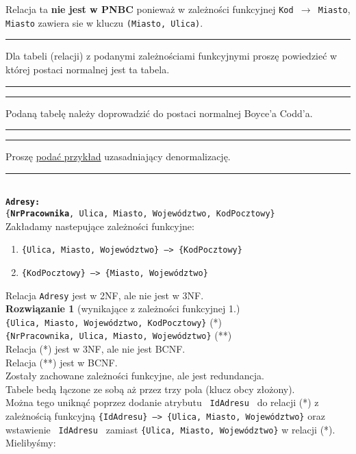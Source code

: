 \documentclass[a5paper,6pt]{article}
\newcommand{\horrule}[1]{\rule{\linewidth}{#1}}
\begin{document}
    Relacja ta \textbf{nie jest w PNBC} ponieważ w zależności funkcyjnej
    \texttt{Kod $\rightarrow$ Miasto}, \texttt{ Miasto} zawiera sie w kluczu
    \texttt{(Miasto, Ulica)}.\\


    \horrule{0.5pt}
    Dla tabeli (relacji) z podanymi zależnościami funkcyjnymi proszę powiedzieć
    w której postaci normalnej jest ta tabela.\\
    \horrule{0.5pt}

    \horrule{0.5pt}
    Podaną tabelę należy doprowadzić do postaci normalnej Boyce’a Codd’a.\\
    \horrule{0.5pt}

    \horrule{0.5pt}
    Proszę \underline{podać przykład} uzasadniający denormalizację.\\
    \horrule{0.5pt}\\

    \texttt{\textbf{Adresy:}\\
    \{\textbf{{\color{green}\faKey}NrPracownika}, Ulica, Miasto,
    Województwo, KodPocztowy\}}\\

    Zakładamy nastepujące zależności funkcyjne:
    \begin{enumerate}
        \item \texttt{\{Ulica, Miasto, Województwo\} --> \{KodPocztowy\}}
        \item \texttt{\{KodPocztowy\} --> \{Miasto, Województwo\}}
    \end{enumerate}

    Relacja \texttt{Adresy} jest w 2NF, ale nie jest w 3NF.\\

    \textbf{Rozwiązanie 1} (wynikające z zależności funkcyjnej 1.)\\

    \texttt{\{{\color{green}\faKey}{\color{blue}\faKey}Ulica,
    {\color{green}\faKey}Miasto, {\color{green}\faKey}Województwo,
    {\color{blue}\faKey}KodPocztowy\}} (*)\\
    \texttt{\{{\color{green}\faKey}NrPracownika, Ulica, Miasto, Województwo\}}
    (**)\\

    Relacja (*) jest w 3NF, ale nie jest BCNF.\\
    Relacja (**) jest w BCNF.\\

    Zostały zachowane zależności funkcyjne, ale jest redundancja.\\
    Tabele bedą łączone ze sobą aż przez trzy pola (klucz obcy złożony).\\
    Można tego uniknąć poprzez dodanie atrybutu \texttt{ IdAdresu } do
    relacji (*) z zależnością funkcyjną \texttt{\{IdAdresu\} --> \{Ulica,
    Miasto, Województwo\}} oraz wstawienie \texttt{ IdAdresu } zamiast
    \texttt{\{Ulica, Miasto, Województwo\}} w relacji (*). Mielibyśmy:\\
\end{document}
